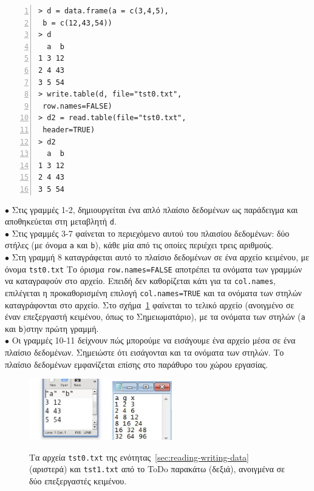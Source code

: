 \documentclass[a4paper,11pt,twocolumn,tablecaptionabove]{scrartcl}
\begin{document}
\begin{Verbatim}[frame=single,numbers=left,gobble=0, xleftmargin=0.35cm, numbersep=0.1cm]
> d = data.frame(a = c(3,4,5), 
 b = c(12,43,54))
> d
  a  b
1 3 12
2 4 43
3 5 54
> write.table(d, file="tst0.txt",
 row.names=FALSE)
> d2 = read.table(file="tst0.txt", 
 header=TRUE)
> d2
  a  b
1 3 12
2 4 43
3 5 54
\end{Verbatim}
\noindent $\bullet$ Στις γραμμές 1-2, δημιουργείται ένα απλό πλαίσιο δεδομένων ως παράδειγμα και αποθηκεύεται 
στη μεταβλητή \texttt{d}. \\
\noindent $\bullet$ Στις γραμμές 3-7 φαίνεται το περιεχόμενο αυτού του πλαισίου δεδομένων: δύο στήλες (με 
όνομα \texttt{a} και \texttt{b}), κάθε μία από τις οποίες περιέχει τρεις αριθμούς.\\
\noindent $\bullet$ Στη γραμμή 8 καταγράφεται αυτό το πλαίσιο δεδομένων σε ένα αρχείο κειμένου, με όνομα
\texttt{tst0.txt} Το όρισμα \verb!row.names=FALSE! αποτρέπει τα ονόματα των γραμμών να καταγραφούν στο αρχείο.
Επειδή δεν καθορίζεται κάτι για τα \texttt{col.names}, επιλέγεται η προκαθορισμένη επιλογή \verb!col.names=TRUE!
και τα ονόματα των στηλών καταγράφονται στο αρχείο. Στο σχήμα~\ref{fig:tst0} φαίνεται το τελικό αρχείο 
(ανοιγμένο σε έναν επεξεργαστή κειμένου, όπως το Σημειωματάριο), με τα ονόματα των στηλών (\texttt{a} και
\texttt{b})στην πρώτη γραμμή. \\
\noindent $\bullet$ Οι γραμμές 10-11 δείχνουν πώς μπορούμε να εισάγουμε ένα αρχείο μέσα σε ένα πλαίσιο
δεδομένων. Σημειώστε ότι εισάγονται και τα ονόματα των στηλών. Το πλαίσιο δεδομένων εμφανίζεται επίσης στο
παράθυρο του χώρου εργασίας.\\

\begin{figure}[h]
  \centering
  \includegraphics[width=3.5cm]{img/tst0.jpeg}
  \includegraphics[width=2.6cm]{img/tst1.jpg}
  \caption{Τα αρχεία \texttt{tst0.txt} της ενότητας~\ref{sec:reading-writing-data}
    (αριστερά) και \texttt{tst1.txt} από το ToDo παρακάτω (δεξιά), ανοιγμένα σε δύο επεξεργαστές κειμένου.}
  \label{fig:tst0}
\end{figure}
\end{document}

